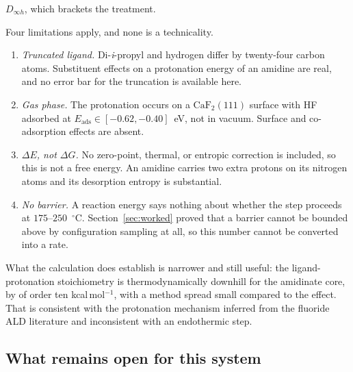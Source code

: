 $D_{\infty h}$, which brackets
the treatment.

\begin{remark}
Four limitations apply, and none is a technicality.
\begin{enumerate}
\item \emph{Truncated ligand.} Di-\emph{i}-propyl and hydrogen differ by
twenty-four carbon atoms. Substituent effects on a protonation energy of an
amidine are real, and no error bar for the truncation is available here.
\item \emph{Gas phase.} The protonation occurs on a $\mathrm{CaF_2}(111)$ surface
with HF adsorbed at $E_{\mathrm{ads}} \in[-0.62,-0.40]$~eV, not in vacuum. Surface
and co-adsorption effects are absent.
\item \emph{$\Delta E$, not $\Delta G$.} No zero-point, thermal, or entropic
correction is included, so this is not a free energy. An amidine carries two extra
protons on its nitrogen atoms and its desorption entropy is substantial.
\item \emph{No barrier.} A reaction energy says nothing about whether the step
proceeds at $175$--$250$~$^\circ$C. Section~\ref{sec:worked} proved that a barrier
cannot be bounded above by configuration sampling at all, so this number cannot be
converted into a rate.
\end{enumerate}
What the calculation does establish is narrower and still useful: the
ligand-protonation stoichiometry is thermodynamically downhill for the amidinate
core, by of order ten kcal\,mol$^{-1}$, with a method spread small compared to the
effect. That is consistent with the protonation mechanism inferred from the
fluoride ALD literature and inconsistent with an endothermic step.
\end{remark}

\subsection{What remains open for this system}

